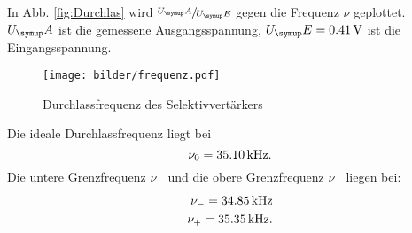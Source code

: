 In Abb. \ref{fig:Durchlas} wird $\sfrac{U_\su{A}}{U_\su{E}}$ gegen die Frequenz
$\nu$ geplottet. $U_\su{A}$ ist die gemessene Ausgangsspannung, $U_\su{E} = 0.41\,\si{\volt}$
ist die Eingangsspannung.
\begin{figure}
  \centering
  \texttt{[image: bilder/frequenz.pdf]}
  \caption{Durchlassfrequenz des Selektivvertärkers}
  \label{fig:Durchlass}
\end{figure}
Die ideale Durchlassfrequenz liegt bei
\begin{equation}
  \nu_0 = 35.10 \,\si{\kilo\hertz}.
\end{equation}
Die untere Grenzfrequenz $\nu_-$ und die obere Grenzfrequenz $\nu_+$ liegen bei:
\begin{align}
  \nu_- = 34.85 \,\si{\kilo\hertz} \\
  \nu_+ = 35.35 \,\si{\kilo\hertz}.
\end{align}









